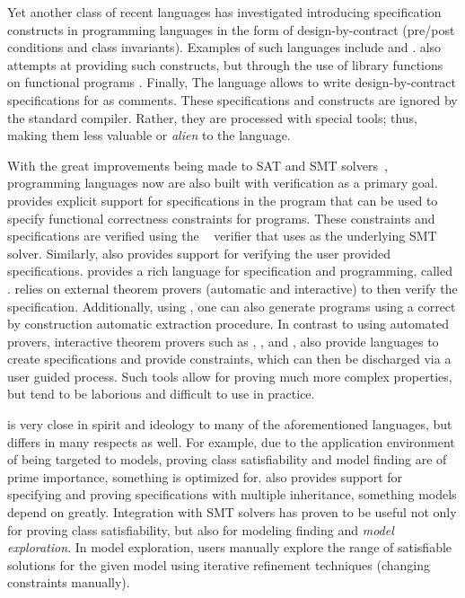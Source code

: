Yet another class of recent languages has investigated introducing
specification constructs in programming languages in the form of
design-by-contract (pre/post conditions and class
invariants). Examples of such languages include \eiffel{}
\cite{eiffel} and \specsharp{} \cite{specsharp}. \scala{} also
attempts at providing such constructs, but through the use of library
functions on functional programs \cite{odersky-rv10}. Finally, The
\jml{} language \cite{jml} allows to write design-by-contract
specifications for \java{} as comments. These specifications and
constructs are ignored by the standard \java{} compiler. Rather, they
are processed with special tools; thus, making them less valuable or
{\em alien} to the language.

With the great improvements being made to SAT and SMT
solvers~\cite{smt-lib,de2008z3}, programming languages now are also
built with verification as a primary goal. \dafny{}
\cite{leino-lpar-2010} provides explicit support for specifications in
the program that can be used to specify functional correctness
constraints for programs. These constraints and specifications are
verified using the \boogie{}~\cite{barnett2006boogie} verifier that
uses \zthree{} as the underlying SMT solver. Similarly, \specsharp{}
also provides support for verifying the user provided
specifications. \whythree{} \cite{filliatre-why3-2011} provides a rich
language for specification and programming, called
\whyml{}. \whythree{} relies on external theorem provers (automatic
and interactive) to then verify the specification. Additionally, using
\whyml{}, one can also generate \ocaml{} programs using a correct by
construction automatic extraction procedure. In contrast to using
automated provers, interactive theorem provers such as \pvs{}
\cite{cade92-pvs,pvs-website}, \coq{} \cite{coq-website}, and
\isabelle{} \cite{isabelle-website}, also provide languages to create
specifications and provide constraints, which can then be discharged
via a user guided process. Such tools allow for proving much more
complex properties, but tend to be laborious and difficult to use in
practice.

\Klang{} is very close in spirit and ideology to many of the
aforementioned languages, but differs in many respects as well. For
example, due to the application environment of \Klang{} being targeted
to \sysml{} models, proving class satisfiability and model finding are
of prime importance, something \Klang{} is optimized for. \Klang{}
also provides support for specifying and proving specifications with
multiple inheritance, something \sysml{} models depend on
greatly. Integration with SMT solvers has proven to be useful not only
for proving class satisfiability, but also for modeling finding and
{\em model exploration}. In model exploration, users manually explore
the range of satisfiable solutions for the given model using iterative
refinement techniques (changing constraints manually). 
